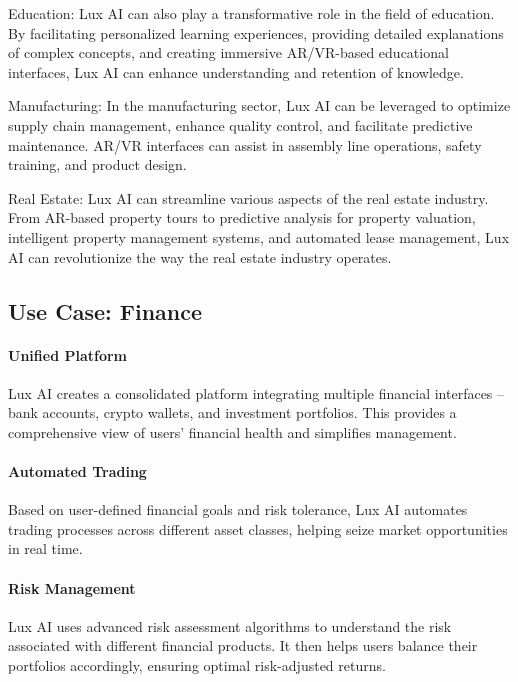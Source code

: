 \documentclass[11pt]{article}
\begin{document}
Education: Lux AI can also play a transformative role in the field of education. By facilitating personalized learning experiences, providing detailed explanations of complex concepts, and creating immersive AR/VR-based educational interfaces, Lux AI can enhance understanding and retention of knowledge.


Manufacturing: In the manufacturing sector, Lux AI can be leveraged to optimize supply chain management, enhance quality control, and facilitate predictive maintenance. AR/VR interfaces can assist in assembly line operations, safety training, and product design.


Real Estate: Lux AI can streamline various aspects of the real estate industry. From AR-based property tours to predictive analysis for property valuation, intelligent property management systems, and automated lease management, Lux AI can revolutionize the way the real estate industry operates.


\subsection{Use Case: Finance}

\paragraph{Unified Platform}

Lux AI creates a consolidated platform integrating multiple financial interfaces -- bank accounts, crypto wallets, and investment portfolios. This provides a comprehensive view of users' financial health and simplifies management.


\paragraph{Automated Trading}

Based on user-defined financial goals and risk tolerance, Lux AI automates trading processes across different asset classes, helping seize market opportunities in real time.


\paragraph{Risk Management}

Lux AI uses advanced risk assessment algorithms to understand the risk associated with different financial products. It then helps users balance their portfolios accordingly, ensuring optimal risk-adjusted returns.
\end{document}
